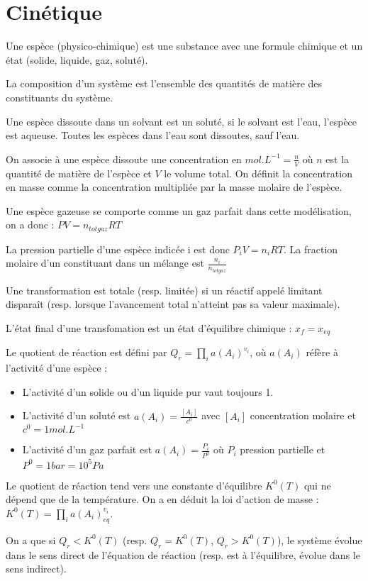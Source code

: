 \documentclass[a4paper,12pt]{book}
\newcommand{\Def}[2]{\begin{tcolorbox}[colback=white,colframe=red!10!green!20!blue!75!, title=Définition : #1]#2\end{tcolorbox}}
\newcommand{\Thr}[2]{\begin{tcolorbox}[sharp corners, colback=white,colframe=red!10!blue!30!green!75!, title=Théorème : #1]#2\end{tcolorbox}}
\begin{document}
\section{Cinétique}
\Def{Généralités}{Une espèce (physico-chimique) est une substance avec une formule chimique et un état (solide, liquide, gaz, soluté).
\par La composition d'un système est l'ensemble des quantités de matière des constituants du système.
\par Une espèce dissoute dans un solvant est un soluté, si le solvant est l'eau, l'espèce est aqueuse. Toutes les espèces dans l'eau sont dissoutes, sauf l'eau.
\par On associe à une espèce dissoute une concentration en $mol.L^{-1} = \frac{n}{V}$ où $n$ est la quantité de matière de l'espèce et $V$ le volume total. On définit la concentration en masse comme la concentration multipliée par la masse molaire de l'espèce.
\par Une espèce gazeuse se comporte comme un gaz parfait dans cette modélisation, on a donc : $PV = n_{totgaz}RT$
\par La pression partielle d'une espèce indicée i est donc $P_i V=n_iRT$. La fraction molaire d'un constituant dans un mélange est $\frac{n_i}{n_{totgaz}}$
\par Une transformation est totale (resp. limitée) si un réactif appelé limitant disparaît (resp. lorsque l'avancement total n'atteint pas sa valeur maximale).
\par L'état final d'une transfomation est un état d'équilibre chimique : $x_f = x_{eq}$ 
}
\Thr{Evolution chimique}{Le quotient de réaction est défini par $Q_r = \prod\limits_{i} a(A_i)^{v_i}$, où $a(A_i)$ réfère à l'activité d'une espèce :\begin{itemize}
\item L'activité d'un solide ou d'un liquide pur vaut toujours 1.
\item L'activité d'un soluté est $a(A_i) = \frac{[A_i]}{c^0}$ avec $[A_i]$ concentration molaire et $c^0 = 1 mol.L^{-1}$
\item L'activité d'un gaz parfait est $a(A_i) = \frac{P_i}{P^0}$ où $P_i$ pression partielle et $P^0 = 1 bar = 10^5 Pa$
\end{itemize}
Le quotient de réaction tend vers une constante d'équilibre $K^0(T)$ qui ne dépend que de la température. On a en déduit la loi d'action de masse : $K^0(T)=\prod\limits_{i}a(A_i)_{eq}^{v_i}$.
\par On a que si $Q_r<K^0(T)$ (resp. $Q_r=K^0(T)$, $Q_r>K^0(T)$), le système évolue dans le sens direct de l'équation de réaction (resp. est à l'équilibre, évolue dans le sens indirect).
}
\end{document}
